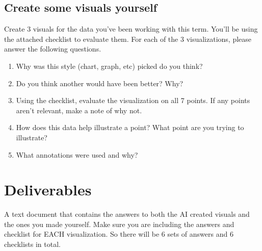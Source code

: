 \documentclass[12pt]{article}
\begin{document}
\subsection*{Create some visuals yourself}
Create 3 visuals for the data you've been working with this term.  You'll be using the attached checklist to evaluate them.  For each of the 3 visualizations, please answer the following questions.
    \begin{enumerate}
        \item Why was this style (chart, graph, etc) picked do you think? 
        \item Do you think another would have been better? Why? 
        \item Using the checklist, evaluate the visualization on all 7 points. If any points aren't relevant, make a note of why not.
        \item How does this data help illustrate a point? What point are you trying to illustrate?
        \item What annotations were used and why?
    \end{enumerate}



\section*{Deliverables}
A text document that contains the answers to both the AI created visuals and the ones you made yourself.  Make sure you are including the answers and checklist for EACH visualization. So there will be 6 sets of answers and 6 checklists in total. 
\end{document}
